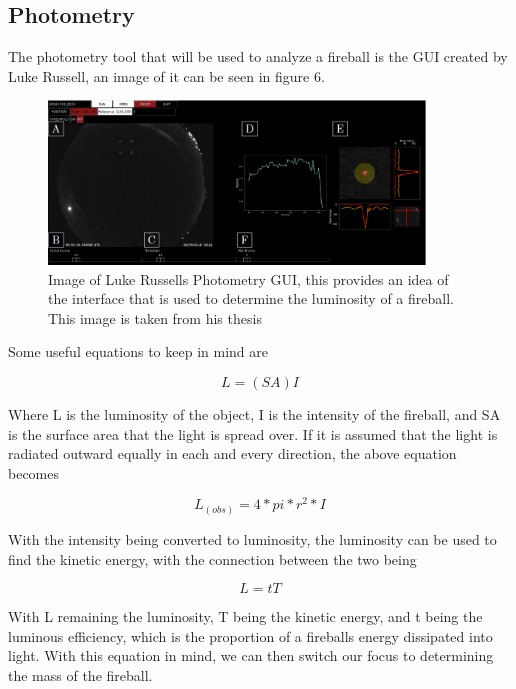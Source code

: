 \subsection{Photometry}

The photometry tool that will be used to analyze a fireball is the GUI created by Luke Russell, an image of it can be seen in figure 6\cite{Russell}.

\begin{figure}
    \centering
    \includegraphics[width=10cm]{Russell-GUI.png}
    \caption{Image of Luke Russells Photometry GUI, this provides an idea of the interface that is used to determine the luminosity of a fireball. This image is taken from his thesis \cite{Russell}}
    \label{Figure 7}
\end{figure}

Some useful equations to keep in mind are 

\begin{equation}
    L = (SA)I
\end{equation}

Where L is the luminosity of the object, I is the intensity of the fireball, and SA is the surface area that the light is spread over. If it is assumed that the light is radiated outward equally in each and every direction, the above equation becomes

\begin{equation}
    L_(obs)=4*pi*r^2*I
\end{equation}

With the intensity being converted to luminosity, the luminosity can be used to find the kinetic energy, with the connection between the two being

\begin{equation}
    L = tT
\end{equation}

With L remaining the luminosity, T being the kinetic energy,  and t being the luminous efficiency, which is the proportion of a fireballs energy dissipated into light. With this equation in mind, we can then switch our focus to determining the mass of the fireball.


